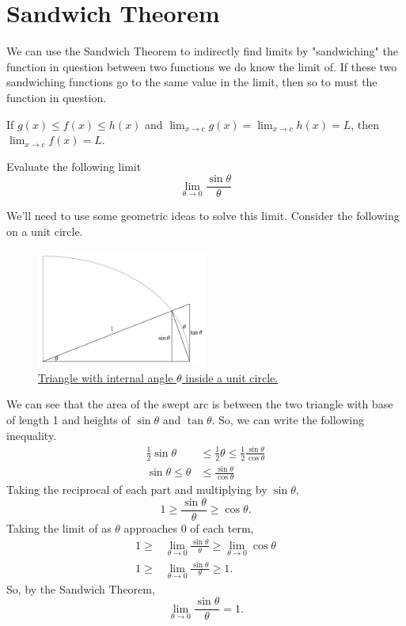 \section{Sandwich Theorem}
We can use the Sandwich Theorem to indirectly find limits by "sandwiching" the function in question between two functions we do know the limit of.
If these two sandwiching functions go to the same value in the limit, then so to must the function in question.
\begin{theorem}
	If $g(x) \leq f(x) \leq h(x)$ and $\lim_{x \to c}{g(x)} = \lim_{x\to c}{h(x)} = L$, then $\lim_{x \to c}{f(x)} = L$.
\end{theorem}

\begin{example}
	Evaluate the following limit
	\begin{equation*}
		\lim_{\theta \to 0}{\frac{\sin{\theta}}{\theta}}
	\end{equation*}
\end{example}
We'll need to use some geometric ideas to solve this limit.
Consider the following on a unit circle.

\begin{figure}[H]
	\label{sin_limit_proof}
	\centering
	\includegraphics[width = 0.5\textwidth]{./limits_continuity/sin_limit_proof.png}
	\caption{\hyperref{}{}{}{Triangle with internal angle $\theta$ inside a unit circle.}}
\end{figure}

We can see that the area of the swept arc is between the two triangle with base of length 1 and heights of $\sin{\theta}$ and $\tan{\theta}$.
So, we can write the following inequality.
\begin{align*}
	\frac{1}{2}\sin{\theta} &\leq \frac{1}{2}\theta \leq \frac{1}{2}\frac{\sin{\theta}}{\cos{\theta}} \\
	\sin{\theta} \leq \theta &\leq \frac{\sin{\theta}}{\cos{\theta}}
\end{align*}
\indent
Taking the reciprocal of each part and multiplying by $\sin{\theta}$,
\begin{equation*}
	1 \geq \frac{\sin{\theta}}{\theta} \geq \cos{\theta}.
\end{equation*}
\indent
Taking the limit of as $\theta$ approaches 0 of each term,
\begin{align*}
	1 \geq & \lim_{\theta \to 0}{\frac{\sin{\theta}}{\theta}} \geq \lim_{\theta\to 0}{\cos{\theta}} \\
	1 \geq & \lim_{\theta \to 0}{\frac{\sin{\theta}}{\theta}} \geq 1.
\end{align*}
\indent
So, by the Sandwich Theorem,
\begin{equation*}
	\lim_{\theta \to 0}{\frac{\sin{\theta}}{\theta}} = 1.
\end{equation*}